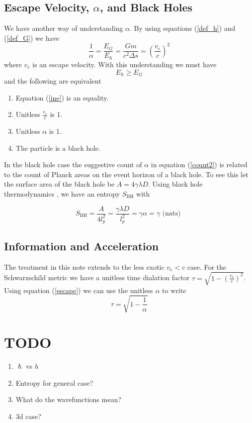 \documentclass[12pt,a4paper]{article}
\begin{document}
\subsection{Escape Velocity, $\alpha$, and Black Holes}
We have another way of understanding $\alpha$.  By using equations (\ref{def_h}) and (\ref{def_G}) we have
\begin{equation}
\label{escape}
  \frac{1}{\alpha} = \frac{E_G}{E_\hslash} = \frac{Gm}{c^2\Delta s} = \left(\frac{v_e}{c}\right)^2
\end{equation}
where $v_e$ is an escape velocity.  With this understanding we must have
\begin{equation}
\label{ine}
   E_\hslash \ge E_G
\end{equation}
and the following are equivalent
\begin{enumerate}
\item Equation (\ref{ine}) is an equality.
\item Unitless $\frac{v_e}{c}$ is 1.
\item Unitless $\alpha$ is 1.
\item The particle is a black hole.
\end{enumerate}
In the black hole case the suggestive count of $\alpha$ in equation (\ref{count2}) is related to the count of Planck areas on the event horizon of a black hole.  To see this let the surface area of the black hole be $A = 4 \gamma \lambda D$.  Using black hole thermodynamics \cite{bekenstein}, we have an entropy $S_\text{BH}$ with

\[
  S_\text{BH} = \frac{A}{4 l_p^2} = \frac{\gamma \lambda D}{l_p^2} = \gamma \alpha = \gamma \text{ (nats) }
\]

\subsection{Information and Acceleration}

The treatment in this note extends to the less exotic $v_e < c$ case.  For the Schwarzschild metric we have a unitless time dialation factor $\tau = \sqrt{1 - \left(\frac{v_e}{c}\right)^2}$.  Using equation (\ref{escape}) we can use the unitless $\alpha$ to write
\[
\tau = \sqrt{1 - \frac{1}{\alpha}}
\]

\section{TODO}
\begin{enumerate}
\item $\hslash$ vs $h$
\item Entropy for general case?
\item What do the wavefunctions mean?
\item 3d case?
\end{enumerate}
\end{document}
